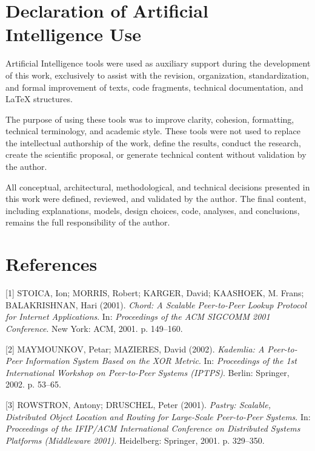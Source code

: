 \documentclass[12pt,a4paper]{article}
\begin{document}
\section*{Declaration of Artificial Intelligence Use}

Artificial Intelligence tools were used as auxiliary support during the development
of this work, exclusively to assist with the revision, organization, standardization,
and formal improvement of texts, code fragments, technical documentation, and
\LaTeX{} structures.

The purpose of using these tools was to improve clarity, cohesion, formatting,
technical terminology, and academic style. These tools were not used to replace the
intellectual authorship of the work, define the results, conduct the research, create
the scientific proposal, or generate technical content without validation by the
author.

All conceptual, architectural, methodological, and technical decisions presented in
this work were defined, reviewed, and validated by the author. The final content,
including explanations, models, design choices, code, analyses, and conclusions,
remains the full responsibility of the author.





\section*{References}
\begingroup
\setlength{\leftskip}{0.5cm}
\setlength{\parindent}{-0.5cm}
\setlength{\parskip}{6pt}

[1] STOICA, Ion; MORRIS, Robert; KARGER, David; KAASHOEK, M. Frans; BALAKRISHNAN, Hari (2001). 
\textit{Chord: A Scalable Peer-to-Peer Lookup Protocol for Internet Applications}. 
In: \textit{Proceedings of the ACM SIGCOMM 2001 Conference}. 
New York: ACM, 2001. p. 149--160.

[2] MAYMOUNKOV, Petar; MAZIERES, David (2002). 
\textit{Kademlia: A Peer-to-Peer Information System Based on the XOR Metric}. 
In: \textit{Proceedings of the 1st International Workshop on Peer-to-Peer Systems (IPTPS)}. 
Berlin: Springer, 2002. p. 53--65.

[3] ROWSTRON, Antony; DRUSCHEL, Peter (2001). 
\textit{Pastry: Scalable, Distributed Object Location and Routing for Large-Scale Peer-to-Peer Systems}. 
In: \textit{Proceedings of the IFIP/ACM International Conference on Distributed Systems Platforms (Middleware 2001)}. 
Heidelberg: Springer, 2001. p. 329--350.
\end{document}
